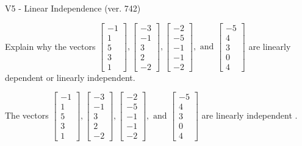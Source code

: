 \begin{exercise}
  \begin{exerciseTitle}V5 - Linear Independence (ver. 742)\end{exerciseTitle}
  \begin{exerciseStatement}
    Explain why the vectors \(\left[\begin{array}{r}
-1 \\
1 \\
5 \\
3 \\
1
\end{array}\right] , \left[\begin{array}{r}
-3 \\
-1 \\
3 \\
2 \\
-2
\end{array}\right] , \left[\begin{array}{r}
-2 \\
-5 \\
-1 \\
-1 \\
-2
\end{array}\right] , \text{ and } \left[\begin{array}{r}
-5 \\
4 \\
3 \\
0 \\
4
\end{array}\right]\) are linearly dependent or linearly independent.	


  \end{exerciseStatement}
  \begin{exerciseAnswer}
   The vectors \(\left[\begin{array}{r}
-1 \\
1 \\
5 \\
3 \\
1
\end{array}\right] , \left[\begin{array}{r}
-3 \\
-1 \\
3 \\
2 \\
-2
\end{array}\right] , \left[\begin{array}{r}
-2 \\
-5 \\
-1 \\
-1 \\
-2
\end{array}\right] , \text{ and } \left[\begin{array}{r}
-5 \\
4 \\
3 \\
0 \\
4
\end{array}\right]\) are 
  	 linearly independent  .
  


  \end{exerciseAnswer}
\end{exercise}